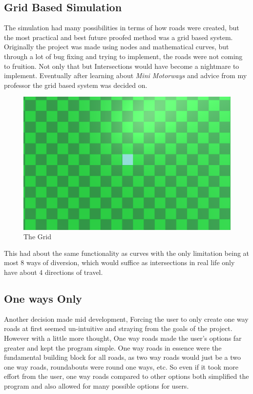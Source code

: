\documentclass[10pt,twocolumn]{article}
\begin{document}
\subsection{Grid Based Simulation}
The simulation had many possibilities in terms of how roads were created, but the most practical and best future proofed method was a grid based system. Originally the project was made using nodes and mathematical curves, but through a lot of bug fixing and trying to implement, the roads were not coming to fruition. Not only that but Intersections would have become a nightmare to implement. Eventually after learning about \textit{Mini Motorways} and advice from my professor the grid based system was decided on. 
\begin{figure}[h]
\caption{The Grid }
\includegraphics[width = 1\linewidth]{BlankGrid.png}
\end{figure}
This had about the same functionality as curves with the only limitation being at most 8 ways of diversion, which would suffice as intersections in real life only have about 4 directions of travel.
\subsection{One ways Only}
Another decision made mid development, Forcing the user to only create one way roads at first seemed un-intuitive and straying from the goals of the project. However with a little more thought, One way roads made the user's options far greater and kept the program simple. One way roads in essence were the fundamental building block for all roads, as two way roads would just be a two one way roads, roundabouts were round one ways, etc. So even if it took more effort from the user, one way roads compared to other options both simplified the program and also allowed for many possible options for users.
\end{document}
